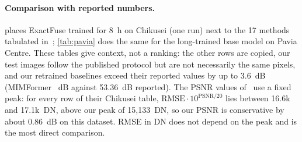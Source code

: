 \documentclass[10pt,twocolumn,letterpaper]{article}
\begin{document}
\paragraph{Comparison with reported numbers.}  places ExactFuse trained for 8~h on Chikusei (one run) next to the 17 methods tabulated in~\cite{chen2026twostage}; \cref{tab:pavia} does the same for the long-trained base model on Pavia Centre. These tables give context, not a ranking: the other rows are copied, our test images follow the published protocol but are not necessarily the same pixels, and our retrained baselines exceed their reported values by up to 3.6~dB (\eg MIMFormer ~dB against 53.36~dB reported). The PSNR values of~\cite{chen2026twostage} use a fixed peak: for every row of their Chikusei table, $\mathrm{RMSE}\cdot10^{\mathrm{PSNR}/20}$ lies between 16.6k and 17.1k~DN, above our peak of 15{,}133~DN, so our PSNR is conservative by about 0.86~dB on this dataset. RMSE in DN does not depend on the peak and is the most direct comparison.
\end{document}
